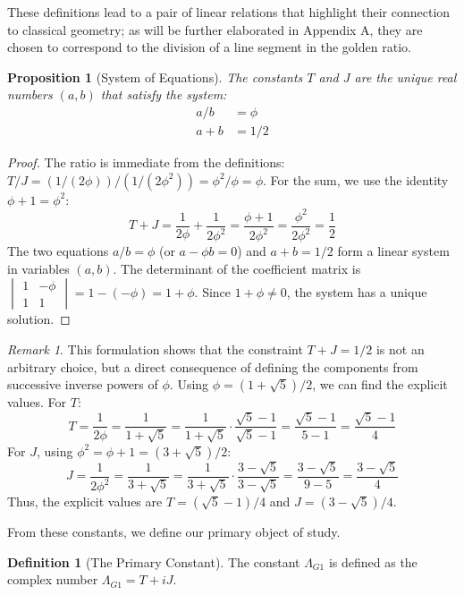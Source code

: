 \documentclass{amsart}
\theoremstyle{plain}
\newtheorem{proposition}[theorem]{Proposition}
\theoremstyle{definition}
\newtheorem{definition}[theorem]{Definition}
\theoremstyle{remark}
\newtheorem*{remark}{Remark}
\newcommand{\LambdaG}{\Lambda_{G1}}
\newcommand{\phiG}{\phi}
\begin{document}
These definitions lead to a pair of linear relations that highlight their connection to classical geometry; as will be further elaborated in Appendix A, they are chosen to correspond to the division of a line segment in the golden ratio.
\begin{proposition}[System of Equations]
The constants $T$ and $J$ are the unique real numbers $(a,b)$ that satisfy the system:
\begin{align}
    a/b &= \phiG \label{eq:1} \\
    a+b &= 1/2 \label{eq:2}
\end{align}
\end{proposition}
\begin{proof}
The ratio is immediate from the definitions: $T/J = (1/(2\phiG))/(1/(2\phiG^2)) = \phiG^2/\phiG = \phiG$. For the sum, we use the identity $\phiG+1 = \phiG^2$:
\[ T+J = \frac{1}{2\phiG} + \frac{1}{2\phiG^2} = \frac{\phiG+1}{2\phiG^2} = \frac{\phiG^2}{2\phiG^2} = \frac{1}{2} \]
The two equations $a/b = \phiG$ (or $a - \phiG b = 0$) and $a+b=1/2$ form a linear system in variables $(a,b)$. The determinant of the coefficient matrix is $\begin{vmatrix} 1 & -\phiG \\ 1 & 1 \end{vmatrix} = 1 - (-\phiG) = 1+\phiG$. Since $1+\phiG \neq 0$, the system has a unique solution.
\end{proof}

\begin{remark}
This formulation shows that the constraint $T+J=1/2$ is not an arbitrary choice, but a direct consequence of defining the components from successive inverse powers of $\phiG$. Using $\phiG = (1+\sqrt{5})/2$, we can find the explicit values. For $T$:
\[ T = \frac{1}{2\phiG} = \frac{1}{1+\sqrt{5}} = \frac{1}{1+\sqrt{5}} \cdot \frac{\sqrt{5}-1}{\sqrt{5}-1} = \frac{\sqrt{5}-1}{5-1} = \frac{\sqrt{5}-1}{4} \]
For $J$, using $\phiG^2 = \phiG+1 = (3+\sqrt{5})/2$:
\[ J = \frac{1}{2\phiG^2} = \frac{1}{3+\sqrt{5}} = \frac{1}{3+\sqrt{5}} \cdot \frac{3-\sqrt{5}}{3-\sqrt{5}} = \frac{3-\sqrt{5}}{9-5} = \frac{3-\sqrt{5}}{4} \]
Thus, the explicit values are $T = (\sqrt{5}-1)/4$ and $J = (3-\sqrt{5})/4$.
\end{remark}

From these constants, we define our primary object of study.
\begin{definition}[The Primary Constant]
The constant $\LambdaG$ is defined as the complex number $\LambdaG = T+iJ$.
\end{definition}
\end{document}
